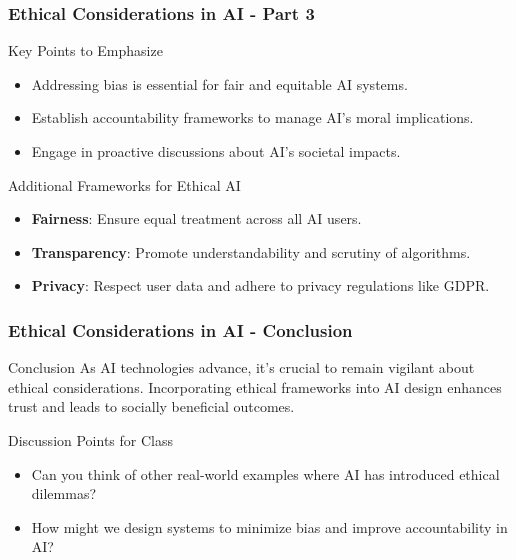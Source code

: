 \documentclass{beamer}
\begin{document}
\begin{frame}[fragile]
    \frametitle{Ethical Considerations in AI - Part 3}
    \begin{block}{Key Points to Emphasize}
        \begin{itemize}
            \item Addressing bias is essential for fair and equitable AI systems.
            \item Establish accountability frameworks to manage AI's moral implications.
            \item Engage in proactive discussions about AI's societal impacts.
        \end{itemize}
    \end{block}

    \begin{block}{Additional Frameworks for Ethical AI}
        \begin{itemize}
            \item \textbf{Fairness}: Ensure equal treatment across all AI users.
            \item \textbf{Transparency}: Promote understandability and scrutiny of algorithms.
            \item \textbf{Privacy}: Respect user data and adhere to privacy regulations like GDPR.
        \end{itemize}
    \end{block}
\end{frame}

\begin{frame}[fragile]
    \frametitle{Ethical Considerations in AI - Conclusion}
    \begin{block}{Conclusion}
        As AI technologies advance, it's crucial to remain vigilant about ethical considerations. Incorporating ethical frameworks into AI design enhances trust and leads to socially beneficial outcomes.
    \end{block}
    
    \begin{block}{Discussion Points for Class}
        \begin{itemize}
            \item Can you think of other real-world examples where AI has introduced ethical dilemmas?
            \item How might we design systems to minimize bias and improve accountability in AI?
        \end{itemize}
    \end{block}
\end{frame}
\end{document}
